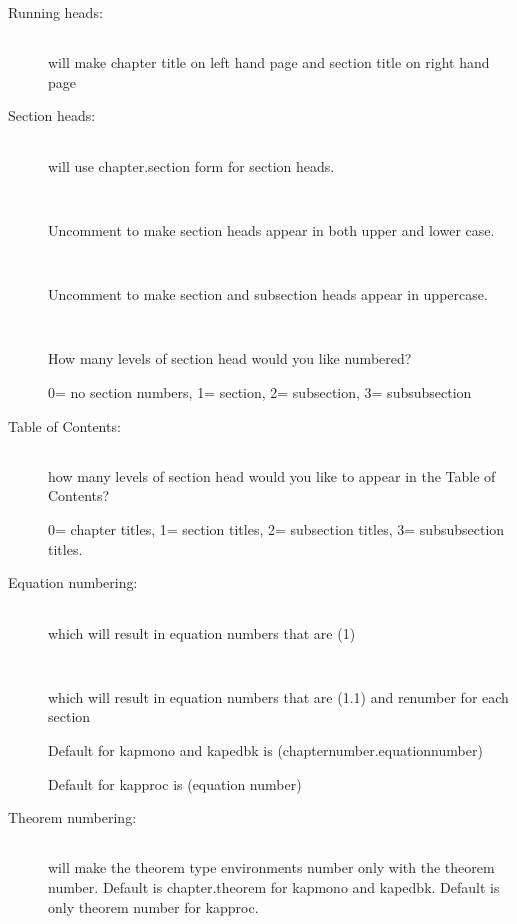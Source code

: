 \documentclass{kapproc} %
\begin{document}
\begin{description}
\item[Running heads:]
\smallskip
\item[{\tt
\string\chapsectrunningheads}]will make chapter title on left hand page
  and section title on right hand page

\bigskip
\item[Section heads:]
\smallskip
\item[{\tt
\string\chaptersection}] will use chapter.section form for section heads.
\bigskip
\item[{\tt
\string\upperandlowercase}]Uncomment to make section heads appear in
                    both upper and lower case.
\bigskip
\item[{\tt
\string\useuppercase}]Uncomment to make section and subsection heads 
                 appear in uppercase.

\bigskip

\item[{\tt
\string\setcounter{}\string{1\string}}]
How many levels of section head would you like numbered?
 
0= no section numbers, 1= section, 2= subsection, 3= subsubsection


\bigskip
\item[Table of Contents:]
\smallskip
\item[{\tt
\string\setcounter{}\string{1\string}}]
how many levels of section head would you like to appear in the
Table of Contents?

 0= chapter titles, 1= section titles, 2= subsection titles, 
 3= subsubsection titles.
\bigskip

\item[Equation numbering:]
\smallskip
\item[{\tt
\string\nochapequationnumber}] 
which will result in equation numbers that are (1)
\bigskip
\item[{\tt
\string\sectionequationnumber}] 
which will result in equation numbers that are (1.1)
   and renumber for each section


Default for kapmono and kapedbk is (chapternumber.equationnumber)

Default for kapproc is (equation number)
\bigskip
\item[Theorem numbering:]
\smallskip
\item[{\tt
\string\nochaptheoremnumber}] will make the theorem type environments number
only with the theorem number. Default is chapter.theorem for 
kapmono and kapedbk. Default is only theorem number for kapproc.


\end{description}
\end{document}
